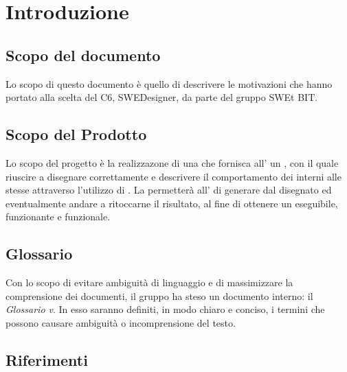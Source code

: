 \section{Introduzione}
  \subsection{Scopo del documento}
          Lo scopo di questo documento è quello di descrivere le motivazioni che hanno portato alla scelta del  C6, SWEDesigner, da parte del gruppo SWEt BIT.
  \subsection{Scopo del Prodotto}
          Lo scopo del progetto è la realizzazone di una  che fornisca all' un  , con il quale riuscire a disegnare correttamente 
          e descrivere il comportamento dei  interni alle stesse attraverso l'utilizzo di .
          La  permetterà all' di generare   dal  disegnato ed eventualmente andare a ritoccarne il risultato, al fine di ottenere un 
          eseguibile, funzionante e funzionale.
  \subsection{Glossario}
          Con lo scopo di evitare ambiguità di linguaggio e di massimizzare la comprensione dei documenti, il
          gruppo ha steso un documento interno: il \emph{Glossario v\VersioneG{}}. In esso saranno definiti, in modo
          chiaro e conciso, i termini che possono causare ambiguità o incomprensione del testo.
  \subsection{Riferimenti}
